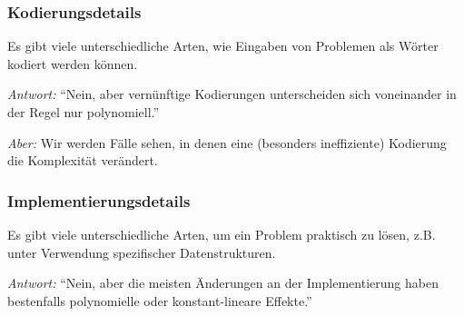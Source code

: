 \documentclass[aspectratio=1610,onlymath]{beamer}
\begin{document}
\begin{frame}\frametitle{Kodierungsdetails}

Es gibt viele unterschiedliche Arten, wie Eingaben von Problemen als Wörter
kodiert werden können.\medskip

\bigskip\pause

\emph{Antwort:} "`Nein, aber vernünftige Kodierungen unterscheiden sich voneinander
in der Regel nur polynomiell."'\bigskip

\bigskip

\emph{Aber:} Wir werden Fälle sehen, in denen eine (besonders ineffiziente) Kodierung die Komplexität verändert.

\end{frame}

\begin{frame}\frametitle{Implementierungsdetails}

Es gibt viele unterschiedliche Arten, um ein Problem praktisch zu lösen,
z.B. unter Verwendung spezifischer Datenstrukturen.\\\smallskip

\pause\bigskip

\emph{Antwort:} "`Nein, aber die meisten Änderungen an der Implementierung haben bestenfalls polynomielle oder konstant-lineare Effekte."'\bigskip



\end{frame}
\end{document}
